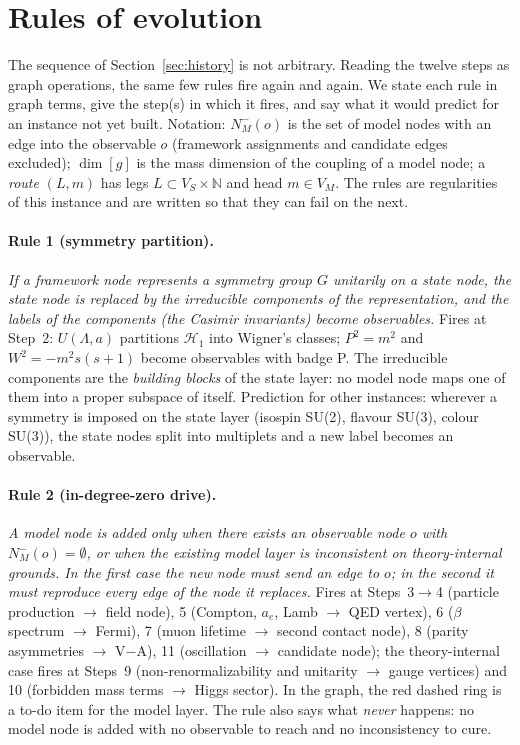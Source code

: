 \section{Rules of evolution}\label{sec:laws}

The sequence of Section~\ref{sec:history} is not arbitrary. Reading the twelve steps as graph operations, the same few rules fire again and again. We state each rule in graph terms, give the step(s) in which it fires, and say what it would predict for an instance not yet built. Notation: $N^-_M(o)$ is the set of model nodes with an edge into the observable $o$ (framework assignments and candidate edges excluded); $\dim[g]$ is the mass dimension of the coupling of a model node; a \emph{route} $(L,m)$ has legs $L\subset V_S\times\mathbb N$ and head $m\in V_M$. The rules are regularities of this instance and are written so that they can fail on the next.

\paragraph{Rule 1 (symmetry partition).} \emph{If a framework node represents a symmetry group $G$ unitarily on a state node, the state node is replaced by the irreducible components of the representation, and the labels of the components (the Casimir invariants) become observables.} Fires at Step~2: $U(\Lambda,a)$ partitions $\mathcal H_1$ into Wigner's classes; $P^2=m^2$ and $W^2=-m^2s(s+1)$ become observables with badge P. The irreducible components are the \emph{building blocks} of the state layer: no model node maps one of them into a proper subspace of itself. Prediction for other instances: wherever a symmetry is imposed on the state layer (isospin SU(2), flavour SU(3), colour SU(3)), the state nodes split into multiplets and a new label becomes an observable.

\paragraph{Rule 2 (in-degree-zero drive).} \emph{A model node is added only when there exists an observable node $o$ with $N^-_M(o)=\emptyset$, or when the existing model layer is inconsistent on theory-internal grounds. In the first case the new node must send an edge to $o$; in the second it must reproduce every edge of the node it replaces.} Fires at Steps~3$\to$4 (particle production $\to$ field node), 5 (Compton, $a_e$, Lamb $\to$ QED vertex), 6 ($\beta$ spectrum $\to$ Fermi), 7 (muon lifetime $\to$ second contact node), 8 (parity asymmetries $\to$ V$-$A), 11 (oscillation $\to$ candidate node); the theory-internal case fires at Steps~9 (non-renormalizability and unitarity $\to$ gauge vertices) and 10 (forbidden mass terms $\to$ Higgs sector). In the graph, the red dashed ring is a to-do item for the model layer. The rule also says what \emph{never} happens: no model node is added with no observable to reach and no inconsistency to cure.


